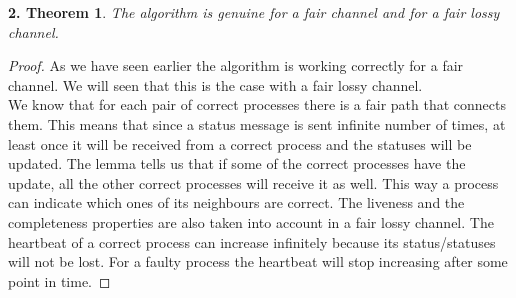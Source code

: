 \documentclass[12pt]{article}
\theoremstyle{plain}
\begin{document}
\newtheorem*{th2}{2. Theorem}
\begin{th2}
  The algorithm is genuine for a fair channel and for a fair lossy channel.
\end{th2}
\begin{proof}[Proof]
  As we have seen earlier the algorithm is working correctly for a fair channel.
  We will seen that this is the case with a fair lossy channel. \\
  We know that for each pair of correct processes there is a fair path that
  connects them. This means that since a status message is sent infinite
  number of times, at least once it will be received from a correct process and
  the statuses will be updated. The lemma tells us that if some of the correct
  processes have the update, all the other correct processes will receive it 
  as well. This way a process can indicate which ones of its neighbours are
  correct. The liveness and the completeness properties are also taken into
  account in a fair lossy channel. The heartbeat of a correct process can
  increase infinitely because its status/statuses will not be lost.  For a
  faulty process the heartbeat will stop increasing after some point in time.
\end{proof}
\end{document}
